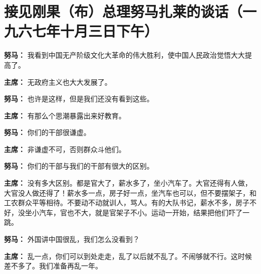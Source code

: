 \section[接见刚果（布）总理努马扎莱的谈话（一九六七年十月三日下午）]{接见刚果（布）总理努马扎莱的谈话（一九六七年十月三日下午）}

\begin{list}{}{
    \setlength{\topsep}{0pt}        %
    \setlength{\partopsep}{0pt}     %
    \setlength{\parsep}{\parskip}   %
    \setlength{\itemsep}{\lineskip}       %
    \setlength{\labelsep}{0pt}%
    \setlength{\labelwidth}{3em}%
    \setlength{\itemindent}{0pt}%
    \setlength\listparindent{\parindent}
    \setlength{\leftmargin}{3em}
    \setlength{\rightmargin}{0pt}
    }

\item[\textbf{努马：}] 我看到中国无产阶级文化大革命的伟大胜利，使中国人民政治觉悟大大提高了。

\item[\textbf{主席：}] 无政府主义也大大发展了。

\item[\textbf{努马：}] 也许是这样，但是我们还没有看到这些。

\item[\textbf{主席：}] 有那么个思潮暴露出来好教育。

\item[\textbf{努马：}] 你们的干部很谦虚。

\item[\textbf{主席：}] 非谦虚不可，否则群众斗他们。

\item[\textbf{努马：}] 你们的干部与我们的干部有很大的区别。

\item[\textbf{主席：}] 没有多大区别。都是官大了，薪水多了，坐小汽车了。大官还得有人做，大官没人做还得了！薪水多一点，房子好一点，坐汽车也可以，但不要摆架子，和工农群众平等相待。不要动不动就训人，骂人。有的大队书记，薪水不多，房子不好，没坐小汽车，官也不大，就是官架子不小。运动一开始，结果把他们吓了一跳。

\item[\textbf{努马：}] 外国讲中国很乱，我们怎么没看到？

\item[\textbf{主席：}] 乱一点，你们可以到处走走，乱了以后就不乱了。不闹够就不行。这时候差不多了。我们准备再乱一年。


\end{list}
